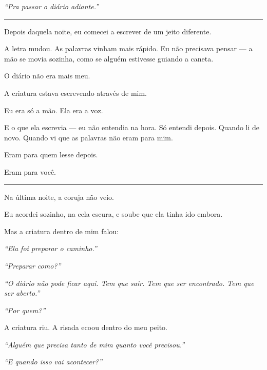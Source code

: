 \noindent \textit{\textquotedblleft{}Pra passar o diário adiante.\textquotedblright{}}

\vspace{0.5em}\noindent\rule{\textwidth}{0.5pt}\vspace{0.5em}

\noindent Depois daquela noite, eu comecei a escrever de um jeito diferente.

\noindent A letra mudou. As palavras vinham mais rápido. Eu não precisava pensar --- a mão se movia sozinha, como se alguém estivesse guiando a caneta.

\noindent O diário não era mais meu.

\noindent A criatura estava escrevendo através de mim.

\noindent Eu era só a mão.
Ela era a voz.

\noindent E o que ela escrevia --- eu não entendia na hora. Só entendi depois. Quando li de novo. Quando vi que as palavras não eram para mim.

\noindent Eram para quem lesse depois.

\noindent Eram para você.

\vspace{0.5em}\noindent\rule{\textwidth}{0.5pt}\vspace{0.5em}

\noindent Na última noite, a coruja não veio.

\noindent Eu acordei sozinho, na cela escura, e soube que ela tinha ido embora.

\noindent Mas a criatura dentro de mim falou:

\noindent \textit{\textquotedblleft{}Ela foi preparar o caminho.\textquotedblright{}}

\noindent \textit{\textquotedblleft{}Preparar como?\textquotedblright{}}

\noindent \textit{\textquotedblleft{}O diário não pode ficar aqui. Tem que sair. Tem que ser encontrado. Tem que ser aberto.\textquotedblright{}}

\noindent \textit{\textquotedblleft{}Por quem?\textquotedblright{}}

\noindent A criatura riu. A risada ecoou dentro do meu peito.

\noindent \textit{\textquotedblleft{}Alguém que precisa tanto de mim quanto você precisou.\textquotedblright{}}

\noindent \textit{\textquotedblleft{}E quando isso vai acontecer?\textquotedblright{}}

